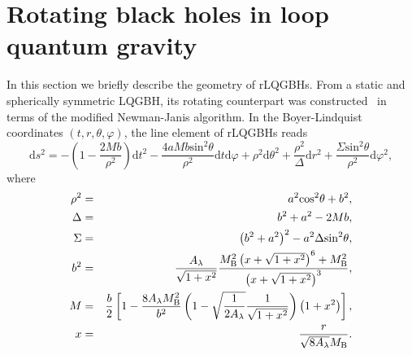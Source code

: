 \documentclass[12pt]{article}
\begin{document}



\section{Rotating black holes in loop quantum gravity }
\label{sec: Rotating_metric}
In this section we briefly describe the geometry of rLQGBHs.
From a static and spherically symmetric LQGBH, its rotating counterpart was constructed~\cite{Brahma:2020eos,Azreg-Ainou:2014pra} in terms of the modified Newman-Janis algorithm.  
In the Boyer-Lindquist coordinates $(t,r,\theta,\varphi)$, the line element of rLQGBHs reads 
\begin{equation}
\label{1rotating_LQGBH_metric}
{\mathrm d}s^2=-\left(1-\frac{2Mb}{\rho^2}\right) {\mathrm d}t^2
-\frac{4aMb\mathrm{sin}^2\theta}{\rho^2}{\mathrm d}t{\mathrm d}\varphi
+\rho^2{\mathrm d}\theta^2+\frac{\rho^2}\Delta {\mathrm d}r^2
+\frac{\Sigma \mathrm{sin}^2\theta}{\rho^2}{\mathrm d}\varphi^2,
\end{equation}
where
\begin{eqnarray}
\rho^2&=&a^2\mathrm{cos}^2\theta+b^2,\label{eq:rho}\\
\Delta&=&b^2+a^2-2Mb, \label{eq:Delta}\\
\Sigma&=&\left( b^2+a^2\right) ^2-a^2\Delta \mathrm{sin}^2\theta,\label{eq:Sigma}\\
b^2&=&\frac{A_\lambda }{\sqrt{1+x^2}}
\frac{M_{\rm B}^2\left( x+\sqrt{1+x^2}\right) ^6+M_{\rm B}^2}{\left( x+\sqrt{1+x^2}\right) ^3},\label{areal}\\
M&=&\frac b 2\left[ 1-\frac{8A_\lambda M_{\rm B}^2}{b^2} \left( 1-\sqrt{\frac 1{2A_\lambda}}\frac {1} {\sqrt{1+x^2}}\right)\left(1+x^2\right) \right], \label{Mb}\\
x&=&\frac r{\sqrt{8A_\lambda}M_{\rm B}}.\label{eq:x}
\end{eqnarray}
\end{document}
